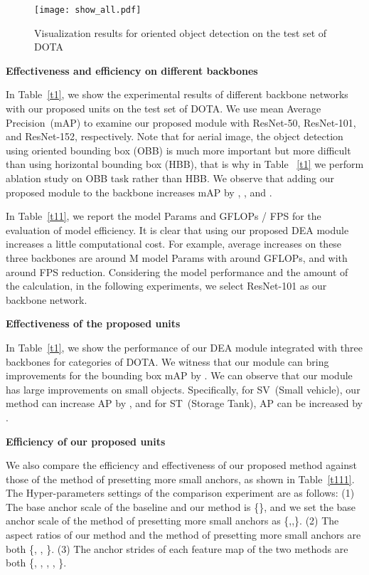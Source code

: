 \documentclass[journal]{IEEEtran}
\newcommand{\myparagraph}[1]{\vspace{0.1em}\noindent\textbf{#1}}
\begin{document}
\begin{figure*}[!htb]
	\begin{center}
	\texttt{[image: show\_all.pdf]}
	\caption{Visualization results for oriented object detection on the test set of DOTA~\cite{xia2018dota}}
	\label{show_all}
	\end{center}
\end{figure*}
\myparagraph{Effectiveness and efficiency on different backbones} 

In Table~\ref{t1}, we show the experimental results of different backbone networks with our proposed units on the test set of DOTA. We use mean Average Precision~(mAP) to examine our proposed module with ResNet-50, ResNet-101, and ResNet-152, respectively. Note that for aerial image, the object detection using oriented bounding box (OBB) is much more important but more difficult than using horizontal bounding box (HBB), that is why in Table ~\ref{t1} we perform ablation study on OBB task rather than HBB. We observe that adding our proposed module to the backbone increases mAP by , , and . 

In Table~\ref{t11}, we report the model Params and GFLOPs / FPS for the evaluation of model efficiency. It is clear that using our proposed DEA module increases a little computational cost. For example, average increases on these three backbones are around  M model Params with around  GFLOPs, and with around  FPS reduction. Considering the model performance and the amount of the calculation, in the following experiments, we select ResNet-101 as our backbone network. 

\myparagraph{Effectiveness of the proposed units}

In Table~\ref{t1}, we show the performance of our DEA module integrated with three backbones for  categories of DOTA. We witness that our module can bring improvements for the bounding box mAP by . We can observe that our module has large improvements on small objects. Specifically, for SV~(Small vehicle), our method can increase AP by , and for ST~(Storage Tank), AP can be increased by . 

\myparagraph{Efficiency of our proposed units}

We also compare the efficiency and effectiveness of our proposed method against those of the method of presetting more small anchors, as shown in Table~\ref{t111}. The Hyper-parameters settings of the comparison experiment are as follows: \newline
(1) The base anchor scale of the baseline and our method is \{\}, and we set the base anchor scale of the method of presetting more small anchors as \{,,\}. \newline
(2) The aspect ratios of our method and the method of presetting more small anchors are both \{, , \}. \newline
(3) The anchor strides of each feature map of the two methods are both \{, , , , \}. 
\end{document}
